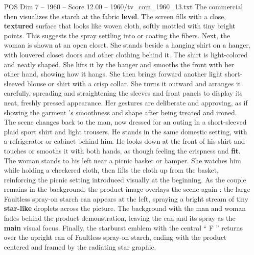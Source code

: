 \begin{textsample}{POS Dim 7 – 1960 – Score 12.00 – 1960/tv\_com\_1960\_13.txt}
The commercial then visualizes the starch at the fabric \textbf{level}.
The screen fills with a close, \textbf{textured} surface that looks like woven cloth, softly mottled with tiny bright points.
This suggests the spray settling into or coating the fibers.
Next, the woman is shown at an open closet.
She stands beside a hanging shirt on a hanger, with louvered closet doors and other clothing behind it.
The shirt is light-colored and neatly shaped.
She lifts it by the hanger and smooths the front with her other hand, showing how it hangs.
She then brings forward another light short-sleeved blouse or shirt with a crisp collar.
She turns it outward and arranges it carefully, spreading and straightening the sleeves and front panels to display its neat, freshly pressed appearance.
Her gestures are deliberate and approving, as if showing the garment ’s smoothness and shape after being treated and ironed.
The scene changes back to the man, now dressed for an outing in a short-sleeved plaid sport shirt and light trousers.
He stands in the same domestic setting, with a refrigerator or cabinet behind him.
He looks down at the front of his shirt and touches or smooths it with both hands, as though feeling the crispness and \textbf{fit}.
The woman stands to his left near a picnic basket or hamper.
She watches him while holding a checkered cloth, then lifts the cloth up from the basket, reinforcing the picnic setting introduced visually at the beginning.
As the couple remains in the background, the product image overlays the scene again : the large Faultless spray-on starch can appears at the left, spraying a bright stream of tiny \textbf{star-like} droplets across the picture.
The background with the man and woman fades behind the product demonstration, leaving the can and its spray as the \textbf{main} visual focus.
Finally, the starburst emblem with the central “ F ” returns over the upright can of Faultless spray-on starch, ending with the product centered and framed by the radiating star graphic.

\end{textsample}
